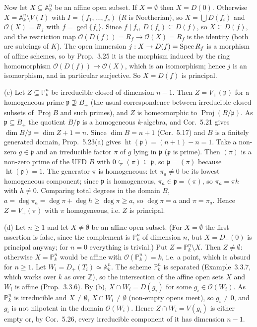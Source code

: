 \documentclass[11pt]{article}
\begin{document}
Now let $X\subseteq\mathbb A^n_k$ be an affine open subset. If $X=\emptyset$ then $X=D(0)$. Otherwise $X=\mathbb A^n_k\setminus V(I)$ with $I=(f_1,\dots,f_s)$ ($R$ is Noetherian), so $X=\bigcup D(f_i)$ and $\mathcal O(X)=R_f$ with $f=\gcd\{f_i\}$. Since $f\mid f_i$, $D(f_i)\subseteq D(f)$, so $X\subseteq D(f)$, and the restriction map $\mathcal O(D(f))=R_f\to\mathcal O(X)=R_f$ is the identity (both are subrings of $K$). The open immersion $j:X\to D(f)=\operatorname{Spec} R_f$ is a morphism of affine schemes, so by Prop.~3.25 it is the morphism induced by the ring homomorphism $\mathcal O(D(f))\to\mathcal O(X)$, which is an isomorphism; hence $j$ is an isomorphism, and in particular surjective. So $X=D(f)$ is principal.

(c) Let $Z\subseteq\mathbb P^n_k$ be irreducible closed of dimension $n-1$. Then $Z=V_+(\mathfrak p)$ for a homogeneous prime $\mathfrak p\not\supseteq B_+$ (the usual correspondence between irreducible closed subsets of $\operatorname{Proj}B$ and such primes), and $Z$ is homeomorphic to $\operatorname{Proj}(B/\mathfrak p)$. As $\mathfrak p\subseteq B_+$ the quotient $B/\mathfrak p$ is a homogeneous $k$-algebra, and Cor.~5.21 gives $\dim B/\mathfrak p=\dim Z+1=n$. Since $\dim B=n+1$ (Cor.~5.17) and $B$ is a finitely generated domain, Prop.~5.23(a) gives $\operatorname{ht}(\mathfrak p)=(n+1)-n=1$. Take a non-zero $g\in\mathfrak p$ and an irreducible factor $\pi$ of $g$ lying in $\mathfrak p$ ($\mathfrak p$ is prime). Then $(\pi)$ is a non-zero prime of the UFD $B$ with $0\subsetneq(\pi)\subseteq\mathfrak p$, so $\mathfrak p=(\pi)$ because $\operatorname{ht}(\mathfrak p)=1$. The generator $\pi$ is homogeneous: let $\pi_a\ne0$ be its lowest homogeneous component; since $\mathfrak p$ is homogeneous, $\pi_a\in\mathfrak p=(\pi)$, so $\pi_a=\pi h$ with $h\ne0$. Comparing total degrees in the domain $B$, $a=\deg\pi_a=\deg\pi+\deg h\ge\deg\pi\ge a$, so $\deg\pi=a$ and $\pi=\pi_a$. Hence $Z=V_+(\pi)$ with $\pi$ homogeneous, i.e. $Z$ is principal.

(d) Let $n\ge1$ and let $X\ne\emptyset$ be an affine open subset. (For $X=\emptyset$ the first assertion is false, since the complement is $\mathbb P^n_k$ of dimension $n$, but $X=D_+(0)$ is principal anyway; for $n=0$ everything is trivial.) Put $Z=\mathbb P^n_k\setminus X$. Then $Z\ne\emptyset$: otherwise $X=\mathbb P^n_k$ would be affine with $\mathcal O(\mathbb P^n_k)=k$, i.e. a point, which is absurd for $n\ge1$. Let $W_i=D_+(T_i)\simeq\mathbb A^n_k$. The scheme $\mathbb P^n_k$ is separated (Example~3.3.7, which works over $k$ as over $\mathbb Z$), so the intersection of the affine open sets $X$ and $W_i$ is affine (Prop.~3.3.6). By (b), $X\cap W_i=D(g_i)$ for some $g_i\in\mathcal O(W_i)$. As $\mathbb P^n_k$ is irreducible and $X\ne\emptyset$, $X\cap W_i\ne\emptyset$ (non-empty opens meet), so $g_i\ne0$, and $g_i$ is not nilpotent in the domain $\mathcal O(W_i)$. Hence $Z\cap W_i=V(g_i)$ is either empty or, by Cor.~5.26, every irreducible component of it has dimension $n-1$.
\end{document}
